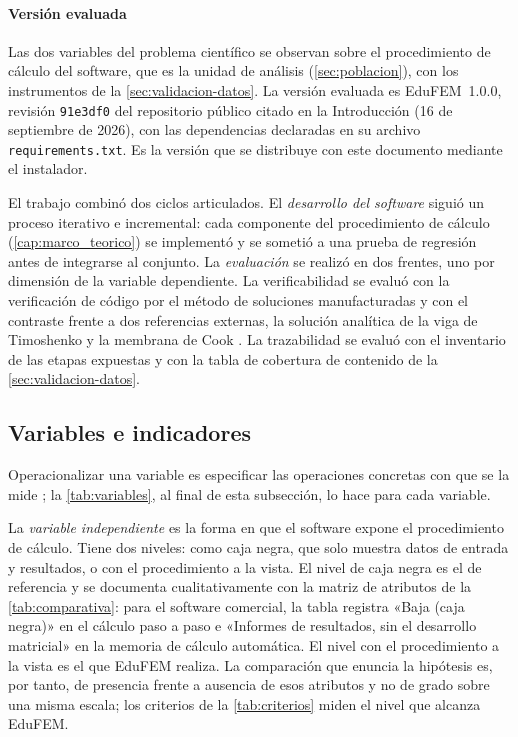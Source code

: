 \paragraph{Versión evaluada} Las dos variables del problema científico se observan sobre el procedimiento de cálculo del software, que es la unidad de análisis (\autoref{sec:poblacion}), con los instrumentos de la \autoref{sec:validacion-datos}. La versión evaluada es EduFEM~1.0.0, revisión \texttt{91e3df0} del repositorio público citado en la Introducción (16 de septiembre de 2026), con las dependencias declaradas en su archivo \texttt{requirements.txt}. Es la versión que se distribuye con este documento mediante el instalador.

El trabajo combinó dos ciclos articulados. El \emph{desarrollo del software} siguió un proceso iterativo e incremental: cada componente del procedimiento de cálculo (\autoref{cap:marco_teorico}) se implementó y se sometió a una prueba de regresión antes de integrarse al conjunto. La \emph{evaluación} se realizó en dos frentes, uno por dimensión de la variable dependiente. La verificabilidad se evaluó con la verificación de código por el método de soluciones manufacturadas y con el contraste frente a dos referencias externas, la solución analítica de la viga de Timoshenko y la membrana de Cook \autocite{oberkampf2010vv,salari2000mms}. La trazabilidad se evaluó con el inventario de las etapas expuestas y con la tabla de cobertura de contenido de la \autoref{sec:validacion-datos}.

\subsection{Variables e indicadores}
\label{sec:variables-met}

Operacionalizar una variable es especificar las operaciones concretas con que se la mide \autocite[p.~137]{sampieri2018metodologia}; la \autoref{tab:variables}, al final de esta subsección, lo hace para cada variable.

La \emph{variable independiente} es la forma en que el software expone el procedimiento de cálculo. Tiene dos niveles: como caja negra, que solo muestra datos de entrada y resultados, o con el procedimiento a la vista. El nivel de caja negra es el de referencia y se documenta cualitativamente con la matriz de atributos de la \autoref{tab:comparativa}: para el software comercial, la tabla registra «Baja (caja negra)» en el cálculo paso a paso e «Informes de resultados, sin el desarrollo matricial» en la memoria de cálculo automática. El nivel con el procedimiento a la vista es el que EduFEM realiza. La comparación que enuncia la hipótesis es, por tanto, de presencia frente a ausencia de esos atributos y no de grado sobre una misma escala; los criterios de la \autoref{tab:criterios} miden el nivel que alcanza EduFEM.

